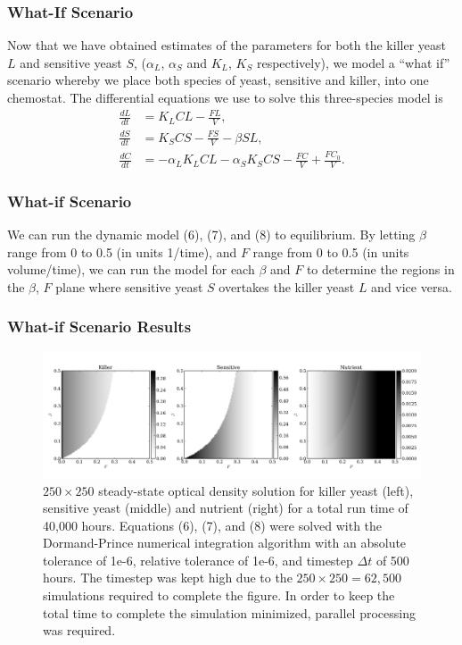 \documentclass{beamer}
\begin{document}
\begin{frame}
  \frametitle{What-If Scenario}
  Now that we have obtained estimates of the parameters for both the killer yeast $L$ and sensitive yeast $S$, ($\alpha_L$, $\alpha_S$ and $K_L$, $K_S$ respectively), we model a ``what if'' scenario whereby we place both species of yeast, sensitive and killer, into one chemostat.  The differential equations we use to solve this three-species model is
  \begin{align}
    \frac{dL}{dt} &= K_L CL - \frac{FL}{V}, \\
    \frac{dS}{dt} &= K_S CS - \frac{FS}{V} - \beta S L, \\
    \frac{dC}{dt} &= -\alpha_L K_L CL -\alpha_S K_S CS - \frac{FC}{V} + \frac{FC_0}{V}.
  \end{align}
\end{frame}

\begin{frame}
  \frametitle{What-if Scenario}
  We can run the dynamic model (6), (7), and (8) to equilibrium.  By letting $\beta$ range from 0 to 0.5 (in units 1/time), and $F$ range from 0 to 0.5 (in units volume/time), we can run the model for each $\beta$ and $F$ to determine the regions in the $\beta$, $F$ plane where sensitive yeast $S$ overtakes the killer yeast $L$ and vice versa.
\end{frame}

\begin{frame}
  \frametitle{What-if Scenario Results}
  \begin{figure}[H]
    \centering
      \includegraphics[width=1.0\textwidth]{../doc/images/sols.png}
    \caption{\footnotesize $250 \times 250$ steady-state optical density solution for killer yeast (left), sensitive yeast (middle) and nutrient (right) for a total run time of 40,000 hours.  Equations (6), (7), and (8) were solved with the Dormand-Prince numerical integration algorithm with an absolute tolerance of 1e-6, relative tolerance of 1e-6, and timestep $\Delta t$ of 500 hours.  The timestep was kept high due to the $250 \times 250 = 62,500$ simulations required to complete the figure.  In order to keep the total time to complete the simulation minimized, parallel processing was required.}
  \end{figure}  
\end{frame}
\end{document}
